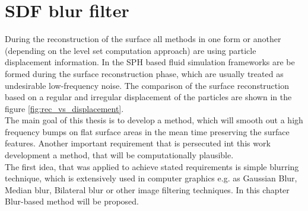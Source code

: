 \chapter{SDF blur filter} \label{sec:blur}
During the reconstruction of the surface all methods in one form or another (depending on the level set computation approach) are using particle displacement information. In the SPH based fluid simulation frameworks are be formed during the surface reconstruction phase, which are usually treated as undesirable low-frequency noise. The comparison of the surface reconstruction based on a regular and irregular displacement of the particles are shown in the figure \ref{fig:rec_vs_displacement}.\\
The main goal of this thesis is to develop a method, which will smooth out a high frequency bumps on flat surface areas in the mean time preserving the surface features. Another important requirement that is persecuted int this work development a method, that will be computationally plausible.\\
The first idea, that was applied to achieve stated requirements is simple blurring technique, which is extensively used in computer graphics e.g. as Gaussian Blur, Median blur, Bilateral blur or other image filtering techniques. In this chapter Blur-based method will be proposed. 
